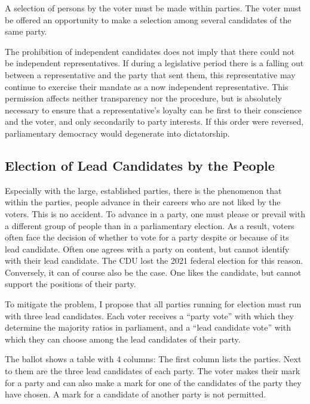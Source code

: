 
A selection of persons by the voter must be made within parties. The
voter must be offered an opportunity to make a selection among several candidates of the same party.


The prohibition of independent candidates does not imply that there could not be independent representatives.
If during a legislative period there is a falling out between a representative
and the party that sent them, this representative may continue to exercise their mandate as a now
independent representative. This permission affects neither transparency nor the
procedure, but is absolutely necessary to ensure that a representative's loyalty
can be first to their conscience and the voter, and only secondarily to party interests.
If this order were reversed, parliamentary democracy would degenerate into
dictatorship.

\subsection{Election of Lead Candidates by the People} \label{subsec:election-of-lead-candidates-by-the-people}

Especially with the large, established parties, there is the phenomenon that within the
parties, people advance in their careers who are not liked by the voters. This is no accident. To
advance in a party, one must please or prevail with a different group of people
than in a parliamentary election. As a result, voters often face
the decision of whether to vote for a party despite or because of its lead candidate. Often
one agrees with a party on content, but cannot identify with their
lead candidate. The CDU lost the 2021 federal election for this reason. Conversely,
it can of course also be the case. One likes the candidate, but cannot support the positions of their party.

To mitigate the problem, I propose that all parties running for election must
run with three lead candidates. Each voter receives a \enquote{party vote} with
which they determine the majority ratios in parliament, and a
\enquote{lead candidate vote} with which they can choose among the lead candidates of their party.

The ballot shows a table with 4 columns: The first column lists the
parties. Next to them are the three lead candidates of each party. The voter makes their
mark for a party and can also make a mark for one of the candidates of the party they have chosen.
A mark for a candidate of another party is not permitted.

